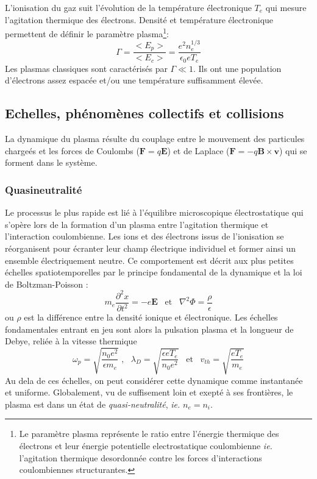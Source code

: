 			L'ionisation du gaz suit l'évolution de la température électronique $T_e$ qui
			mesure l'agitation thermique des électrons. Densité et température
			électronique permettent de définir le paramètre plasma\footnote{Le
			paramètre plasma représente le ratio entre l'énergie thermique des électrons
			et leur énergie potentielle electrostatique coulombienne \emph{ie.}
			l'agitation thermique desordonnée contre les forces d'interactions
			coulombiennes structurantes.}:
				$$\Gamma=\frac{<E_p>}{<E_c>}=\frac{e^2n_e^{1/3}}{\epsilon_0 eT_e}$$
			Les plasmas classiques sont caractérisés par $\Gamma\ll 1$. Ils ont une
			population d'électrons assez espacée et/ou une température suffisamment élevée. 
			
		\subsection{Echelles, phénomènes collectifs et collisions}
		La dynamique du plasma résulte du couplage entre le mouvement des particules chargeés et les forces 
		de Coulombs ($\mathbf F=q\mathbf E$) et de Laplace ($\mathbf F=-q\mathbf
			B\times\mathbf v$) qui se forment dans le système. 
			\subsubsection{Quasineutralité}
			Le processus le plus rapide est lié à
			l'équilibre microscopique électrostatique qui s'opère lors de la formation d'un plasma entre l'agitation thermique et 
			l'interaction coulombienne. Les ions et des électrons
			issus de l'ionisation se réorganisent pour écranter leur champ
			électrique individuel et former ainsi un ensemble électriquement neutre. 
			Ce comportement est décrit aux plus petites échelles spatiotemporelles par le principe fondamental de 
			la dynamique et la loi de Boltzman-Poisson :
			$$m_e\frac{\partial^2 x}{\partial t^2}=-e\mathbf E \;\;\;\text{et}\;\;\;\nabla^2\Phi=\frac{\rho}{\epsilon}$$ 
			ou $\rho$ est la différence entre la densité ionique et électronique.
			Les échelles fondamentales entrant en jeu sont alors la pulsation plasma et la longueur de Debye, 
			reliée à la vitesse thermique 
			$$\omega_p=\sqrt{\frac{n_0e^2}{\epsilon
			m_e}}\;\text{,}\;\;\;\lambda_D=\sqrt{\frac{\epsilon
			eT_e}{n_0e^2}}\;\;\;\text{et}\;\;\;v_{th}=\sqrt{\frac{eT_e}{m_e}}$$
			Au dela de ces échelles, on peut considérer cette dynamique comme instantanée
			et uniforme. Globalement, vu de suffisement loin et exepté à ses frontières,
			le plasma est dans un état de \emph{quasi-neutralité}, \emph{ie.} $n_e=n_i$.
